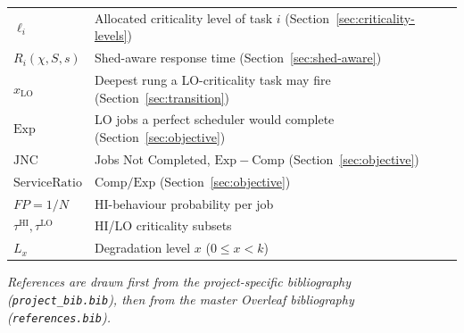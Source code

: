 \documentclass{article}
\begin{document}
\begin{table}[h]
\begin{tabular}{ll}
$\ell_i$ & Allocated criticality level of task $i$ (Section~\ref{sec:criticality-levels}) \\
$R_i(\chi, S, s)$ & Shed-aware response time (Section~\ref{sec:shed-aware}) \\
$x_{\mathrm{LO}}$ & Deepest rung a LO-criticality task may fire (Section~\ref{sec:transition}) \\
$\mathrm{Exp}$ & LO jobs a perfect scheduler would complete (Section~\ref{sec:objective}) \\
$\mathrm{JNC}$ & Jobs Not Completed, $\mathrm{Exp} - \mathrm{Comp}$ (Section~\ref{sec:objective}) \\
$\mathrm{ServiceRatio}$ & $\mathrm{Comp}/\mathrm{Exp}$ (Section~\ref{sec:objective}) \\
$FP = 1/N$ & HI-behaviour probability per job \\
$\tau^{\mathrm{HI}}, \tau^{\mathrm{LO}}$ & HI/LO criticality subsets \\
$L_x$ & Degradation level $x$ ($0 \leq x < k$) \\
\bottomrule
\end{tabular}
\end{table}

\bigskip
\noindent\textit{References are drawn first from the project-specific bibliography
(\texttt{project\_bib.bib}), then from the master Overleaf bibliography
(\texttt{references.bib}).}



\end{document}
